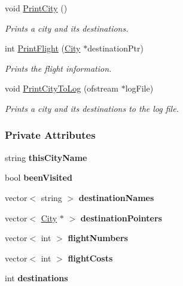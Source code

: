 \begin{DoxyCompactItemize}
void \hyperlink{class_city_a21748cfe68284f984858b6efd4dd9491}{Print\+City} ()
\begin{DoxyCompactList}\small\item\em Prints a city and its destinations. \end{DoxyCompactList}\item 
int \hyperlink{class_city_a2d2102c322dc145afd320bdadd72f563}{Print\+Flight} (\hyperlink{class_city}{City} $\ast$destination\+Ptr)
\begin{DoxyCompactList}\small\item\em Prints the flight information. \end{DoxyCompactList}\item 
void \hyperlink{class_city_aaca0e7f4fce81fa997808d9a261a1c23}{Print\+City\+To\+Log} (ofstream $\ast$log\+File)
\begin{DoxyCompactList}\small\item\em Prints a city and its destinations to the log file. \end{DoxyCompactList}\end{DoxyCompactItemize}
\subsubsection*{Private Attributes}
\begin{DoxyCompactItemize}
\item 
string {\bfseries this\+City\+Name}\hypertarget{class_city_ae7a145a83873d90cda921f91cf2c3df6}{}\label{class_city_ae7a145a83873d90cda921f91cf2c3df6}

\item 
bool {\bfseries been\+Visited}\hypertarget{class_city_a65e6639bf01d861bd776f158b323a603}{}\label{class_city_a65e6639bf01d861bd776f158b323a603}

\item 
vector$<$ string $>$ {\bfseries destination\+Names}\hypertarget{class_city_a7a0c6cf43845c27973df932dfa2f5b6c}{}\label{class_city_a7a0c6cf43845c27973df932dfa2f5b6c}

\item 
vector$<$ \hyperlink{class_city}{City} $\ast$ $>$ {\bfseries destination\+Pointers}\hypertarget{class_city_a09d9e10c348b4722e86e657be058b8a1}{}\label{class_city_a09d9e10c348b4722e86e657be058b8a1}

\item 
vector$<$ int $>$ {\bfseries flight\+Numbers}\hypertarget{class_city_a9d07a2c88c965ce319163d40d585b3be}{}\label{class_city_a9d07a2c88c965ce319163d40d585b3be}

\item 
vector$<$ int $>$ {\bfseries flight\+Costs}\hypertarget{class_city_ad75c3546b6a99b56be98ae35c7f3ad08}{}\label{class_city_ad75c3546b6a99b56be98ae35c7f3ad08}

\item 
int {\bfseries destinations}\hypertarget{class_city_ac118d39bff38032a4781f067fea3525a}{}\label{class_city_ac118d39bff38032a4781f067fea3525a}

\end{DoxyCompactItemize}


